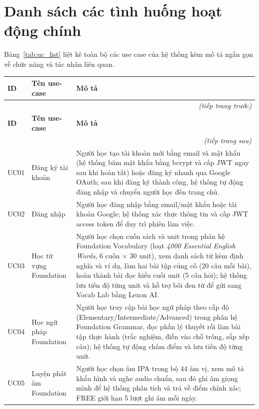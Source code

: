 \section{Danh sách các tình huống hoạt động chính}
Bảng~\ref{tab:uc_list} liệt kê toàn bộ các use case của hệ thống kèm mô tả ngắn gọn về chức năng và tác nhân liên quan.

\renewcommand{\arraystretch}{1.3}
\setlength{\tbu}{\dimexpr(\linewidth - 6\tabcolsep - 4\arrayrulewidth)/150\relax}
\begin{longtable}{|p{15\tbu}|p{45\tbu}|p{90\tbu}|}
    \hline
    \textbf{ID} & \textbf{Tên use-case} & \textbf{Mô tả} \\ \hline
    \endfirsthead
    \multicolumn{3}{r}{\textit{(tiếp trang trước)}} \\
    \hline
    \textbf{ID} & \textbf{Tên use-case} & \textbf{Mô tả} \\ \hline
    \endhead
    \hline \multicolumn{3}{r}{\textit{(tiếp trang sau)}} \\
    \endfoot
    \endlastfoot
    UC01 & Đăng ký tài khoản & Người học tạo tài khoản mới bằng email và mật khẩu (hệ thống băm mật khẩu bằng bcrypt và cấp JWT ngay sau khi hoàn tất) hoặc đăng ký nhanh qua Google OAuth; sau khi đăng ký thành công, hệ thống tự động đăng nhập và chuyển người học đến trang chủ. \\ \hline
    UC02 & Đăng nhập & Người học đăng nhập bằng email/mật khẩu hoặc tài khoản Google; hệ thống xác thực thông tin và cấp JWT access token để duy trì phiên làm việc. \\ \hline
    UC03 & Học từ vựng Foundation & Người học chọn cuốn sách và unit trong phân hệ Foundation Vocabulary (loạt \textit{4000 Essential English Words}, 6 cuốn $\times$ 30 unit), xem danh sách từ kèm định nghĩa và ví dụ, làm hai bài tập củng cố (20 câu mỗi bài), hoàn thành bài đọc hiểu cuối unit (5 câu hỏi); hệ thống lưu tiến độ từng unit và hỗ trợ bôi đen từ để gửi sang Vocab Lab bằng Lexon AI. \\ \hline
    UC04 & Học ngữ pháp Foundation & Người học truy cập bài học ngữ pháp theo cấp độ (Elementary/Intermediate/Advanced) trong phân hệ Foundation Grammar, đọc phần lý thuyết rồi làm bài tập thực hành (trắc nghiệm, điền vào chỗ trống, sắp xếp câu); hệ thống tự động chấm điểm và lưu tiến độ từng unit. \\ \hline
    UC05 & Luyện phát âm Foundation & Người học chọn âm IPA trong bộ 44 âm vị, xem mô tả khẩu hình và nghe audio chuẩn, sau đó ghi âm giọng mình để hệ thống phân tích và trả về điểm chính xác; FREE giới hạn 5 lượt ghi âm mỗi ngày. \\ \hline

\end{longtable}
